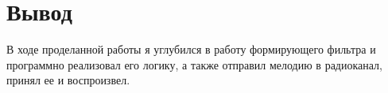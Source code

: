 \chapter{Вывод}
\label{ch:chap3}

В ходе проделанной работы я углубился в работу формирующего фильтра и программно реализовал его логику, а также отправил
мелодию в радиоканал, принял ее и воспроизвел.
\endinput